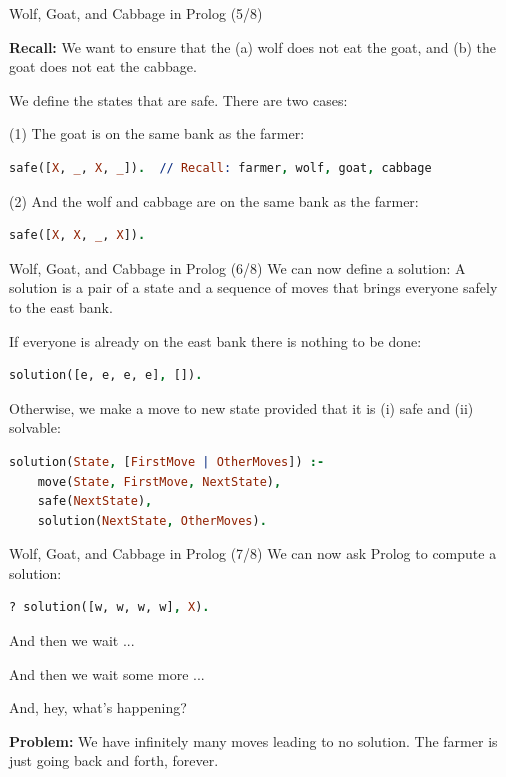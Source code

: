 \begin{frame}[fragile]{Wolf, Goat, and Cabbage in Prolog (5/8)}

\textbf{Recall:} We want to ensure that the (a) wolf does not eat the goat, and
(b) the goat does not eat the cabbage.

We define the states that are safe. There are two cases: 

(1) The goat is on the same bank as the farmer:

\begin{lstlisting}[language=prolog, xleftmargin=0.5cm]
safe([X, _, X, _]).  // Recall: farmer, wolf, goat, cabbage
\end{lstlisting}

(2) And the wolf and cabbage are on the same bank as the farmer:

\begin{lstlisting}[language=prolog, xleftmargin=0.5cm]
safe([X, X, _, X]).
\end{lstlisting}
\end{frame}

\begin{frame}[fragile]{Wolf, Goat, and Cabbage in Prolog (6/8)}
We can now define a solution: A solution is a pair of a state and a sequence of
moves that brings everyone safely to the east bank.

\pause

If everyone is already on the east bank there is nothing to be done:

\begin{lstlisting}[language=prolog, xleftmargin=0.5cm]
solution([e, e, e, e], []).
\end{lstlisting}

\pause 

Otherwise, we make a move to new state provided that it is (i) safe and (ii) solvable:

\begin{lstlisting}[language=prolog, xleftmargin=0.5cm]
solution(State, [FirstMove | OtherMoves]) :- 
    move(State, FirstMove, NextState), 
    safe(NextState), 
    solution(NextState, OtherMoves).
\end{lstlisting}
\end{frame}

\begin{frame}[fragile]{Wolf, Goat, and Cabbage in Prolog (7/8)}
We can now ask Prolog to compute a solution:

\begin{lstlisting}[language=prolog, xleftmargin=0.5cm]
? solution([w, w, w, w], X).
\end{lstlisting}

\pause 

And then we wait ...

\pause 

And then we wait some more ...

\pause 

And, hey, what's happening?

\pause 

\textbf{Problem:} We have infinitely many moves leading to no solution. The
farmer is just going back and forth, forever. 
\end{frame}

